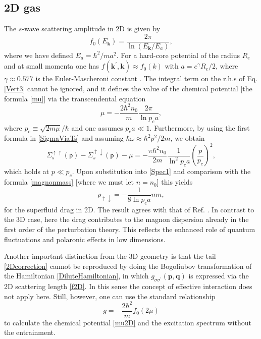 \documentclass[reprint,superscriptaddress,showpacs,nofootinbib,aps,pra]{revtex4-1}
\begin{document}
\subsection{2D gas}

The $s$-wave scattering amplitude in 2D is given by \cite{Landau}
\begin{equation}
\label{f2D}
f_0(E_{\bm k})=\frac{2\pi}{\ln{(E_{\bm k}/E_a)}},
\end{equation}
where we have defined $E_a=\hbar^2/ma^2$. For a hard-core potential of the radius $R_e$ and at small momenta one has $f(\bm k^\prime,\bm k)\approx f_0(k)$ with $a=e^{\gamma} R_e/2$, where $\gamma\approx 0.577$ is the Euler-Mascheroni constant \cite{Schick}. The integral term on the r.h.s of Eq. \eqref{Vert3} cannot be ignored, and it defines the value of the chemical potential [the formula \eqref{mu}] via the transcendental equation 
\begin{equation}
\label{mu2D}
\mu=-\frac{2\hbar^2 n_0}{m}\frac{2\pi}{\ln p_c a},
\end{equation}
where $p_c\equiv\sqrt{2m\mu}/\hbar$ and one assumes $p_c a\ll 1$. Furthermore, by using the first formula in \eqref{SigmaViaTs} and assuming $\hbar\omega\approx\hbar^2 p^2/2m$, we obtain
\begin{equation}
\label{2Dcorrection}
\Sigma_s^{\uparrow\uparrow}(\mathsf p)-\Sigma_s^{\uparrow\downarrow}(\mathsf p)-\mu=-\frac{\pi\hbar^2 n_0}{2m}\frac{1}{\ln^2{p_c a}}\left(\frac{p}{p_c}\right)^2,
\end{equation}
which holds at $p\ll p_c$. Upon substitution into \eqref{Spec1} and comparison with the formula \eqref{magnonmass} [where we must let $n=n_0$] this yields
\begin{equation}
\label{2Ddrag}
\rho_{\uparrow\downarrow}=-\frac{1}{8\ln p_c a}mn,
\end{equation}
for the superfluid drag in 2D. The result agrees with that of Ref. \cite{Pastukhov2}. In contrast to the 3D case, here the drag contributes to the magnon dispersion already in the first order of the perturbation theory. This reflects the enhanced role of quantum fluctuations and polaronic effects in low dimensions.

Another important distinction from the 3D geometry is that the tail \eqref{2Dcorrection} cannot be reproduced by doing the Bogoliubov transformation of the Hamiltonian \eqref{DiluteHamiltonian}, in which $g_{\sigma\sigma^\prime}(\bm p, \bm q)$ is expressed via the 2D scattering length \eqref{f2D}. In this sense the concept of effective interaction does not apply here. Still, however, one can use the standard relationship \cite{Schick}
\begin{equation}
\label{g2D} 
g=-\frac{2\hbar^2}{m}f_0(2\mu)
\end{equation}
to calculate the chemical potential \eqref{mu2D} and the excitation spectrum without the entrainment.
\end{document}
